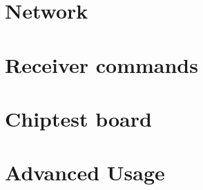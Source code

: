 \documentclass[a4paper]{article}
\begin{document}
\section{Network}
\label{network}
\hypertarget{network}{}

\section{Receiver commands}
\label{receiver}
\hypertarget{receiver}{}

\section{Chiptest board}
\label{ctb}
\hypertarget{ctb}{}

\section{Advanced Usage}
\label{advanced}
\hypertarget{advanced}{}

\printindex
\end{document}
